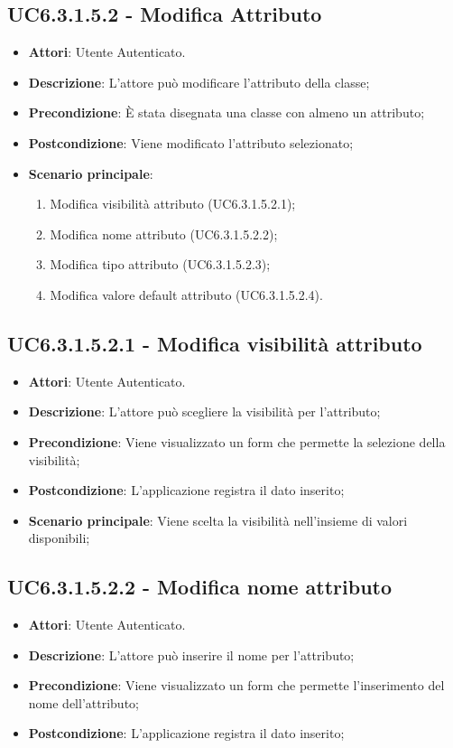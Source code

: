 \subsection{UC6.3.1.5.2 - Modifica Attributo} 
\label{ssec:UC6.3.1.5.2} 
\begin{itemize} 
\item \textbf{Attori}: Utente Autenticato.
\item \textbf{Descrizione}: L'attore può modificare l'attributo della classe;
\item \textbf{Precondizione}: È stata disegnata una classe con almeno un attributo;
\item \textbf{Postcondizione}: Viene modificato l'attributo selezionato;
\item \textbf{Scenario principale}: \begin{enumerate}\item Modifica visibilità attributo (UC6.3.1.5.2.1);\item Modifica nome attributo (UC6.3.1.5.2.2);\item Modifica tipo attributo (UC6.3.1.5.2.3);\item Modifica valore default attributo (UC6.3.1.5.2.4). 
 \end{enumerate}
\end{itemize} 
\subsection{UC6.3.1.5.2.1 - Modifica visibilità attributo} 
\label{ssec:UC6.3.1.5.2.1} 
\begin{itemize} 
\item \textbf{Attori}: Utente Autenticato.
\item \textbf{Descrizione}: L'attore può scegliere la visibilità per l'attributo;
\item \textbf{Precondizione}: Viene visualizzato un form che permette la selezione della visibilità;
\item \textbf{Postcondizione}: L'applicazione registra il dato inserito;
\item \textbf{Scenario principale}: Viene scelta la visibilità nell'insieme di valori disponibili;\end{itemize} 
\subsection{UC6.3.1.5.2.2 - Modifica nome attributo} 
\label{ssec:UC6.3.1.5.2.2} 
\begin{itemize} 
\item \textbf{Attori}: Utente Autenticato.
\item \textbf{Descrizione}: L'attore può inserire il nome per l'attributo;
\item \textbf{Precondizione}: Viene visualizzato un form che permette l'inserimento del nome dell'attributo;
\item \textbf{Postcondizione}: L'applicazione registra il dato inserito;
\end{itemize} 
